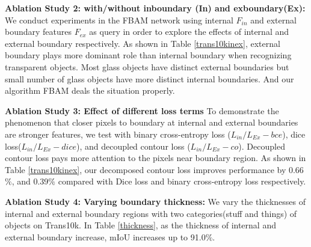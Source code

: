 \documentclass[10pt,twocolumn,letterpaper]{article}
\begin{document}
\textbf{Ablation Study 2: with/without inboundary (In) and
exboundary(Ex):} We conduct experiments in the FBAM network using internal ${\textit{F}}_{in}$ and external boundary features ${\textit{F}}_{ex}$ as query in order to explore the effects of internal and external boundary respectively. As shown in Table \ref{trans10kinex}, external boundary plays more dominant role than internal boundary when recognizing transparent objects. %
Most glass objects have distinct external boundaries but small number of glass objects have more distinct internal boundaries. And our algorithm FBAM deals the situation properly. 

\textbf{Ablation Study 3: Effect of different loss terms} To demonstrate the phenomenon that closer pixels to boundary at internal and external boundaries are stronger features, we test with binary cross-entropy loss (${\textit{L}}_{in}/{\textit{L}}_{Ex}-bce$), dice loss(${\textit{L}}_{in}/{\textit{L}}_{Ex}-dice$), and decoupled contour loss (${\textit{L}}_{in}/{\textit{L}}_{Ex}-co$). 
Decoupled contour loss pays more attention to the pixels near boundary region. As shown in Table \ref{trans10kinex}, our decomposed contour loss improves performance by 0.66$\%$, and 0.39$\%$ compared with Dice loss and binary cross-entropy loss respectively.

\textbf{Ablation Study 4: Varying boundary thickness:} We vary the thicknesses of internal and external boundary regions with two categories(stuff and things) of objects on Trans10k. In Table \ref{thickness}, as the thickness of internal and external boundary increase, mIoU increases up to 91.0$\%$. %
\end{document}

